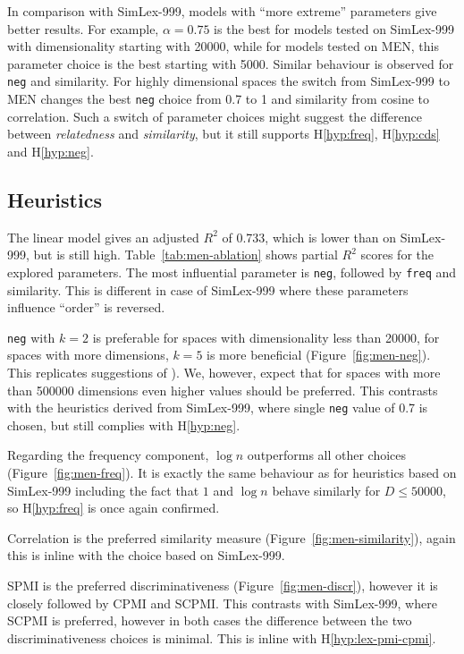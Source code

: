In comparison with SimLex-999, models with ``more extreme'' parameters give better results. For example, $\alpha = 0.75$ is the best for models tested on SimLex-999 with dimensionality starting with 20000, while for models tested on MEN, this parameter choice is the best starting with 5000. Similar behaviour is observed for \texttt{neg} and similarity. For highly dimensional spaces the switch from SimLex-999 to MEN changes the best \texttt{neg} choice from 0.7 to 1 and similarity from cosine to correlation. Such a switch of parameter choices might suggest the difference between \textit{relatedness} and \textit{similarity}, but it still supports H\ref{hyp:freq}, H\ref{hyp:cds} and H\ref{hyp:neg}.

\subsection{Heuristics}
\label{sec:heuristics-men}


The linear model gives an adjusted $R^2$ of 0.733, which is lower than on SimLex-999, but is still high. Table~\ref{tab:men-ablation} shows partial $R^2$ scores for the explored parameters. The most influential parameter is \texttt{neg}, followed by \texttt{freq} and similarity. This is different in case of SimLex-999 where these parameters influence ``order'' is reversed.


\texttt{neg} with $k = 2$ is preferable for spaces with dimensionality less than 20000, for spaces with more dimensions,
$k = 5$ is more beneficial (Figure~\ref{fig:men-neg}). This replicates suggestions of ). We, however, expect that for spaces with more than 500000 dimensions even higher values should be preferred. This contrasts with the heuristics derived from SimLex-999, where single \texttt{neg} value of 0.7 is chosen, but still complies with H\ref{hyp:neg}.

Regarding the frequency component, $\log n$ outperforms all other choices (Figure~\ref{fig:men-freq}). It is exactly the same behaviour as for heuristics based on SimLex-999 including the fact that $1$ and $\log n$ behave similarly for $D \leq 50000$, so H\ref{hyp:freq} is once again confirmed.


Correlation is the preferred similarity measure (Figure~\ref{fig:men-similarity}), again this is inline with the choice based on SimLex-999.

SPMI is the preferred discriminativeness (Figure~\ref{fig:men-discr}), however it is closely followed by CPMI and SCPMI. This contrasts with SimLex-999, where SCPMI is preferred, however in both cases the difference between the two discriminativeness choices is minimal. This is inline with H\ref{hyp:lex-pmi-cpmi}.


